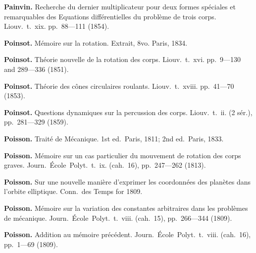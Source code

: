 \documentclass[12pt,a4paper]{article}
\theoremstyle{definition}
\begin{document}
\vspace{0.5em}

\noindent\textbf{Painvin.} Recherche du dernier multiplicateur pour deux formes sp\'{e}ciales et remarquables des Equations diff\'{e}rentielles du probl\`{e}me de trois corps. Liouv.~t.~xix. pp.~88---111 (1854).

\vspace{0.5em}

\noindent\textbf{Poinsot.} M\'{e}moire sur la rotation. Extrait, 8vo. Paris, 1834.

\vspace{0.5em}

\noindent\textbf{Poinsot.} Th\'{e}orie nouvelle de la rotation des corps. Liouv.~t.~xvi. pp.~9---130 and 289---336 (1851).

\vspace{0.5em}

\noindent\textbf{Poinsot.} Th\'{e}orie des c\^{o}nes circulaires roulants. Liouv.~t.~xviii. pp.~41---70 (1853).

\vspace{0.5em}

\noindent\textbf{Poinsot.} Questions dynamiques sur la percussion des corps. Liouv.~t.~ii. (2 s\'{e}r.), pp.~281---329 (1859).

\vspace{0.5em}

\noindent\textbf{Poisson.} Trait\'{e} de M\'{e}canique. 1st ed.~Paris, 1811; 2nd ed.~Paris, 1833.

\vspace{0.5em}

\noindent\textbf{Poisson.} M\'{e}moire sur un cas particulier du mouvement de rotation des corps graves. Journ.~\'{E}cole~Polyt.~t.~ix. (cah.~16), pp.~247---262 (1813).

\vspace{0.5em}

\noindent\textbf{Poisson.} Sur une nouvelle mani\`{e}re d'exprimer les coordonn\'{e}es des plan\`{e}tes dans l'orbite elliptique. Conn.~des Temps for 1809.

\vspace{0.5em}

\noindent\textbf{Poisson.} M\'{e}moire sur la variation des constantes arbitraires dans les probl\`{e}mes de m\'{e}canique. Journ.~\'{E}cole~Polyt.~t.~viii. (cah.~15), pp.~266---344 (1809).

\vspace{0.5em}

\noindent\textbf{Poisson.} Addition au m\'{e}moire pr\'{e}c\'{e}dent. Journ.~\'{E}cole~Polyt.~t.~viii. (cah.~16), pp.~1---69 (1809).
\end{document}
